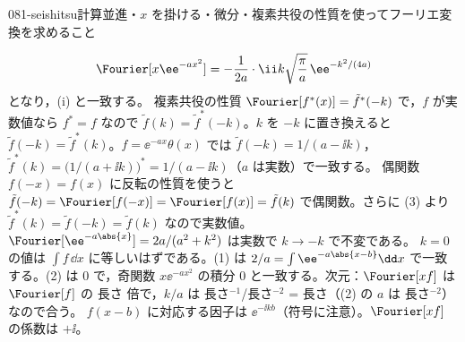 \documentclass[uplatex,dvipdfmx,a4paper,11pt]{jsarticle}
\begin{document}
\begin{mondai}{081-seishitsu}{計算}{並進・$x$ を掛ける・微分・複素共役の性質を使ってフーリエ変換を求めること}
\begin{tadashii}
\[ \Fourier[x\ee^{-ax^{2}}]=-\frac{1}{2a}\cdot\ii k\sqrt{\frac{\pi}{a}}\,\ee^{-k^{2}/(4a)} \]
となり，(i) と一致する。
 複素共役の性質 $\Fourier[f^{*}(x)]=\tilde f^{*}(-k)$ で，$f$ が実数値なら $f^{*}=f$ なので $\tilde f(k)=\tilde f^{*}(-k)$。$k$ を $-k$ に置き換えると $\tilde f(-k)=\tilde f^{*}(k)$。$f=\ee^{-ax}\theta(x)$ では $\tilde f(-k)=1/(a-\ii k)$，$\tilde f^{*}(k)=\bigl(1/(a+\ii k)\bigr)^{*}=1/(a-\ii k)$（$a$ は実数）で一致する。
 偶関数 $f(-x)=f(x)$ に反転の性質を使うと $\tilde f(-k)=\Fourier[f(-x)]=\Fourier[f(x)]=\tilde f(k)$ で偶関数。さらに (3) より $\tilde f^{*}(k)=\tilde f(-k)=\tilde f(k)$ なので実数値。$\Fourier[\ee^{-a\abs{x}}]=2a/(a^{2}+k^{2})$ は実数で $k\to-k$ で不変である。
\kenzan $k=0$ の値は $\int f\,\dd x$ に等しいはずである。(1) は $2/a=\int\ee^{-a\abs{x-b}}\dd x$ で一致する。(2) は 0 で，奇関数 $x\ee^{-ax^{2}}$ の積分 0 と一致する。次元：$\Fourier[xf]$ は $\Fourier[f]$ の 長さ 倍で，$k/a$ は 長さ$^{-1}$/長さ$^{-2}$ = 長さ（(2) の $a$ は 長さ$^{-2}$）なので合う。
\tsumazuki $f(x-b)$ に対応する因子は $\ee^{-\ii kb}$（符号に注意）。$\Fourier[xf]$ の係数は $+\ii$。
\end{tadashii}
\end{mondai}
\end{document}

